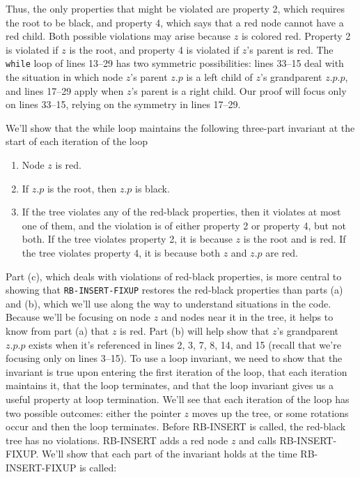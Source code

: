 \documentclass{report}
\begin{document}
\bigbreak \noindent 
Thus, the only properties that might be violated are property 2, which requires the root to be black, and property 4, which says that a red node cannot have a red child. Both possible violations may arise because \(z\) is colored red. Property 2 is violated if \(z\) is the root, and property 4 is violated if \(z\)'s parent is red.
\bigbreak \noindent 
The \texttt{while} loop of lines 13–29 has two symmetric possibilities: lines 33–15 deal with the situation in which node \(z\)'s parent \(z.p\) is a left child of \(z\)'s grandparent \(z.p.p\), and lines 17–29 apply when \(z\)'s parent is a right child. Our proof will focus only on lines 33–15, relying on the symmetry in lines 17–29.

\bigbreak \noindent 
We’ll show that the while loop maintains the following three-part invariant at the start of each iteration of the loop
\begin{enumerate}
    \item Node \(z\) is red.
    \item If \(z.p\) is the root, then \(z.p\) is black.
    \item If the tree violates any of the red-black properties, then it violates at most one of them, and the violation is of either property 2 or property 4, but not both. If the tree violates property 2, it is because \(z\) is the root and is red. If the tree violates property 4, it is because both \(z\) and \(z.p\) are red.
\end{enumerate}
\bigbreak \noindent 
Part (c), which deals with violations of red-black properties, is more central to showing that \texttt{RB-INSERT-FIXUP} restores the red-black properties than parts (a) and (b), which we’ll use along the way to understand situations in the code. 
\bigbreak \noindent 
Because we’ll be focusing on node \(z\) and nodes near it in the tree, it helps to know from part (a) that \(z\) is red. Part (b) will help show that \(z\)’s grandparent \(z.p.p\) exists when it’s referenced in lines 2, 3, 7, 8, 14, and 15 (recall that we’re focusing only on lines 3–15).
\bigbreak \noindent 
To use a loop invariant, we need to show that the invariant is true upon entering the first iteration of the loop, that each iteration maintains it, that the loop terminates, and that the loop invariant gives us a useful property at loop termination. We’ll see that each iteration of the loop has two possible outcomes: either the pointer $z$ moves up the tree, or some rotations occur and then the loop terminates.
\bigbreak \noindent 
Before RB-INSERT is called, the red-black tree has no violations. RB-INSERT adds a red node $z$ and calls RB-INSERT-FIXUP. We’ll show that each part of the invariant holds at the time RB-INSERT-FIXUP is called:
\end{document}
